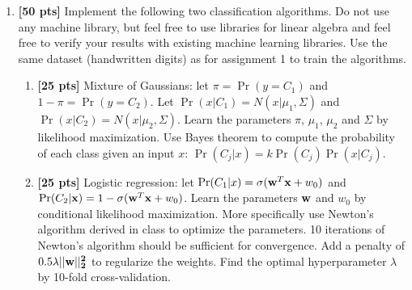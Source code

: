\documentclass{article}
\begin{document}
\begin{enumerate}


\item {\bf [50 pts]} Implement the following two
  classification algorithms.  Do not use any machine library, but feel free to use libraries for linear algebra and feel free to verify your results with existing machine learning libraries.  Use the same dataset (handwritten digits) as for assignment 1 to train the algorithms. 

  \begin{enumerate}
  \item {\bf [25 pts]} Mixture of Gaussians: let $\pi = \Pr(y=C_1)$
    and $1-\pi = \Pr(y=C_2)$. Let $\Pr(x|C_1) = N(x|\mu_1,\Sigma)$ and
    $\Pr(x|C_2) = N(x|\mu_2,\Sigma)$.  Learn the parameters $\pi$,
    $\mu_1$, $\mu_2$ and $\Sigma$ by likelihood maximization.  Use
    Bayes theorem to compute the probability of each class given an
    input $x$: $\Pr(C_j|x) = k \Pr(C_j) \Pr(x|C_j)$.

  \item {\bf [25 pts]} Logistic regression: let $\Pr(C_1|x) =
    \sigma({\bf{w}}^T{\bf{x}}+w_0)$ and $\Pr(C_2|{\bf{x}}) = 1 - \sigma({\bf{w}}^T{\bf{x}}+w_0)$.  Learn the
    parameters ${\bf{w}}$ and $w_0$ by conditional likelihood maximization.
    More specifically use Newton's algorithm derived in class to
    optimize the parameters.  10 iterations of Newton's algorithm
    should be sufficient for convergence.  Add a penalty of $0.5\lambda ||\bf{w}||_2^2$ to regularize the weights.  Find the optimal hyperparameter $\lambda$ by 10-fold cross-validation. 
  \end{enumerate}


\end{enumerate}
\end{document}

